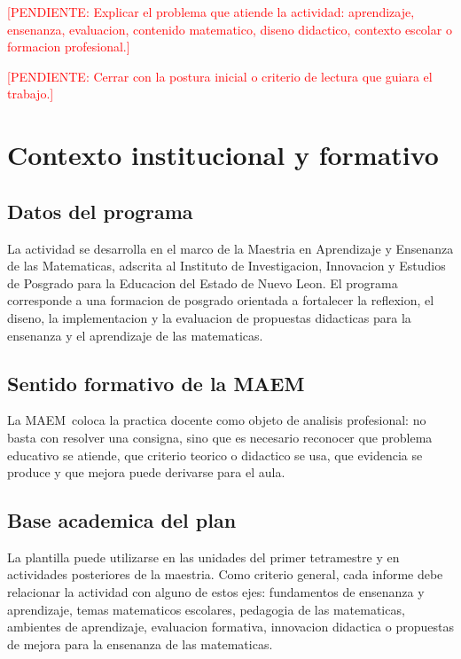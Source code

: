 \documentclass[
	spanish,
	letterpaper, oneside
]{article}
\def\universityname {Instituto de Investigacion, Innovacion y Estudios de Posgrado para la Educacion del Estado de Nuevo Leon}
\def\universityfaculty {Maestria en Aprendizaje y Ensenanza de las Matematicas}
\def\programshort {MAEM}
\newcommand{\pendiente}[1]{\textcolor{red}{[PENDIENTE: #1]}}
\begin{document}
\pendiente{Explicar el problema que atiende la actividad: aprendizaje, ensenanza, evaluacion, contenido matematico, diseno didactico, contexto escolar o formacion profesional.}

\pendiente{Cerrar con la postura inicial o criterio de lectura que guiara el trabajo.}

\section{Contexto institucional y formativo}

\subsection{Datos del programa}

La actividad se desarrolla en el marco de la \universityfaculty, adscrita al
\universityname. El programa corresponde a una formacion de posgrado orientada a
fortalecer la reflexion, el diseno, la implementacion y la evaluacion de
propuestas didacticas para la ensenanza y el aprendizaje de las matematicas.

\subsection{Sentido formativo de la MAEM}

La \programshort\ coloca la practica docente como objeto de analisis profesional:
no basta con resolver una consigna, sino que es necesario reconocer que problema
educativo se atiende, que criterio teorico o didactico se usa, que evidencia se
produce y que mejora puede derivarse para el aula.

\subsection{Base academica del plan}

La plantilla puede utilizarse en las unidades del primer tetramestre y en
actividades posteriores de la maestria. Como criterio general, cada informe debe
relacionar la actividad con alguno de estos ejes: fundamentos de ensenanza y
aprendizaje, temas matematicos escolares, pedagogia de las matematicas,
ambientes de aprendizaje, evaluacion formativa, innovacion didactica o
propuestas de mejora para la ensenanza de las matematicas.
\end{document}
